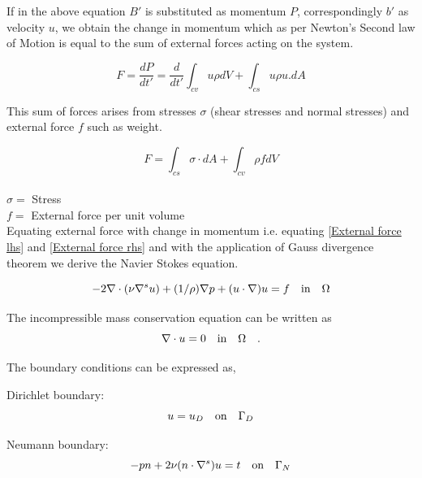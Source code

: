 \documentclass[a4paper,12pt]{book}
\begin{document}
If in the above equation $B'$ is substituted as momentum $P$, correspondingly $b'$ as velocity $u$, we obtain the change in momentum which as per Newton's Second law of Motion is equal to the sum of external forces acting on the system. 

\begin{equation}\label{External force lhs}
F = \frac{dP}{dt'} = \frac{d}{dt'} \int_{cv} u \rho dV + \int_{cs} u \rho u.dA 
\end{equation}

This sum of forces arises from stresses $\sigma$ (shear stresses and normal stresses) and external force $f$ such as weight. 

\begin{equation}\label{External force rhs}
F = \int_{cs} \sigma \cdot dA + \int_{cv} \rho f dV
\end{equation}
\\
$\sigma =$ Stress\\
$f =$ External force per unit volume\\

Equating external force with change in momentum i.e. equating \eqref{External force lhs} and \eqref{External force rhs} and with the application of Gauss divergence theorem we derive the Navier Stokes equation.

\begin{equation} \label{navier_stokes}
-2\nabla \cdot (\nu \nabla^s u) + (1/\rho) \nabla p + (u \cdot \nabla)u = f \quad   \textnormal{in}  \quad \Omega
\end{equation} 

The incompressible mass conservation equation can be written as
\begin{equation}\label{mass_conservation}
\nabla \cdot u=0 \quad   \textnormal{in}  \quad \Omega \quad \textrm{.}
\end{equation}

The boundary conditions can be expressed as,

Dirichlet boundary:
\begin{equation}\label{dirichlet_ns}
u=u_D \quad \textnormal{on} \quad \Gamma_D
\end{equation}

Neumann boundary:
\begin{equation} \label{neumann_ns}
-pn + 2\nu(n \cdot \nabla^s)u = t \quad   \textnormal{on}  \quad \Gamma_N
\end{equation}
\end{document}
